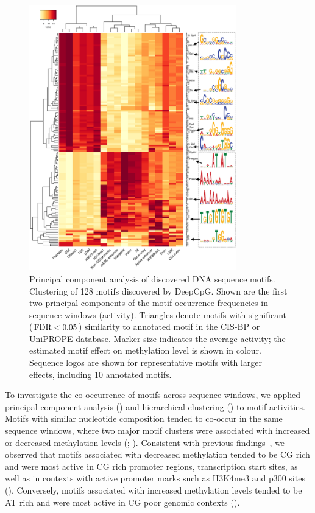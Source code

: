 \begin{figure}[htbp!]
\centering
\includegraphics[width=0.8\textwidth]{motifs_act}
\caption[Principal component analysis of discovered DNA sequence motifs.]{Principal component analysis of discovered DNA sequence motifs. Clustering of 128 motifs discovered by DeepCpG. Shown are the first two principal components of the motif occurrence frequencies in sequence windows (activity). Triangles denote motifs with significant ($\operatorname{FDR}<0.05$) similarity to annotated motif in the CIS-BP or UniPROPE database. Marker size indicates the average activity; the estimated motif effect on methylation level is shown in colour. Sequence logos are shown for representative motifs with larger effects, including 10 annotated motifs.}
\label{fig:dcpg_motifs_act}
\end{figure}

To investigate the co-occurrence of motifs across sequence windows, we applied principal component analysis () and hierarchical clustering () to motif activities.  Motifs with similar nucleotide composition tended to co-occur in the same sequence windows, where two major motif clusters were associated with increased or decreased methylation levels (; ). Consistent with previous findings~\citep{mendenhall_gc-rich_2010,thomson_cpg_2010,whitaker_predicting_2015}, we observed that motifs associated with decreased methylation tended to be CG rich and were most active in CG rich promoter regions, transcription start sites, as well as in contexts with active promoter marks such as H3K4me3 and p300 sites (). Conversely, motifs associated with increased methylation levels tended to be AT rich and were most active in CG poor genomic contexts ().

